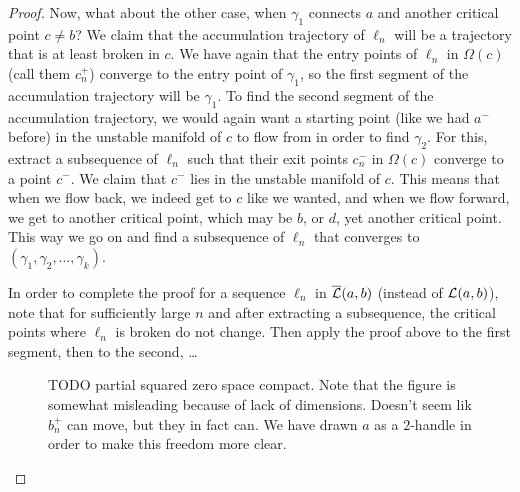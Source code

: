 \begin{proof}
    Now, what about the other case, when $\gamma_1$ connects $a$ and another critical point $c \neq b$?
    We claim that the accumulation trajectory of $\ell_n$ will be a trajectory that is at least broken in $c$.
We have again that the entry points of $\ell_n$ in $\Omega(c)$ (call them $c_n^{+}$) converge to the entry point of $\gamma_1$, so the first segment of the accumulation trajectory will be $\gamma_1$.
To find the second segment of the accumulation trajectory, we would again want a starting point (like we had $a^{-}$ before) in the unstable manifold of $c$ to flow from in order to find $\gamma_{2}$.
For this, extract a subsequence of $\ell_n$ such that their exit points $c^{-}_n$ in $\Omega(c)$ converge to a point $c^{-}$.
We claim that $c^{-}$ lies in the unstable manifold of $c$.
This means that when we flow back, we indeed get to $c$ like we wanted, and when we flow forward, we get to another critical point, which may be $b$, or $d$, yet another critical point. This way we go on and find a subsequence of $\ell_n$ that converges to $(\gamma_1, \gamma_2, \ldots, \gamma_k)$.

In order to complete the proof for a sequence $\ell_n$ in $ \overline{\mathcal L}(a, b)$ (instead of $\mathcal L(a, b)$), note that for sufficiently large $n$ and after extracting a subsequence, the critical points where $ \ell_n$ is broken do not change. Then apply the proof above to the first segment, then to the second, \ldots


\begin{figure}[H]
    \centering
    \caption{TODO partial squared zero space compact.
        Note that the figure is somewhat misleading because of lack of dimensions.
        Doesn't seem lik $b_n^{+}$ can move, but they in fact can.
        We have drawn $a$ as a $2$-handle in order to make this freedom more clear.
    }
    \label{fig:partial-squared-zero-space-compact}
\end{figure}
\end{proof}

